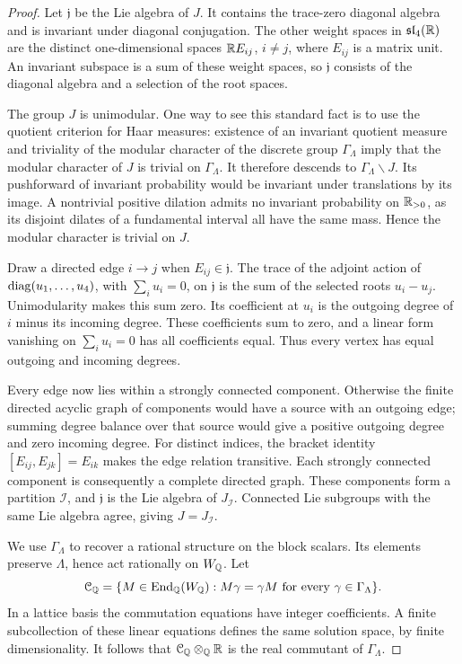 \begin{proof}
Let \(\mathfrak j\) be the Lie algebra of \(J\).
It contains the trace-zero diagonal algebra and is invariant under
diagonal conjugation.  The other weight spaces in
\(\mathfrak{sl}_4(\mathbb R)\) are the distinct one-dimensional spaces
\(\mathbb R E_{ij}\), \(i\ne j\), where \(E_{ij}\) is a matrix unit.
An invariant subspace is a sum of these weight spaces, so
\(\mathfrak j\) consists of the diagonal algebra and a selection of
the root spaces.

The group \(J\) is unimodular.
One way to see this standard fact is to use the quotient
criterion for Haar measures: existence of an invariant quotient
measure and triviality of the modular character of the discrete
group \(\Gamma_\Lambda\) imply that the modular character of \(J\)
is trivial on \(\Gamma_\Lambda\).  It therefore descends to
\(\Gamma_\Lambda\backslash J\).  Its pushforward of invariant
probability would be invariant under translations by its image.
A nontrivial positive dilation admits no invariant probability on
\(\mathbb R_{>0}\), as its disjoint dilates of a fundamental interval all
have the same mass.  Hence the modular character is trivial on \(J\).

Draw a directed edge \(i\to j\) when \(E_{ij}\in\mathfrak j\).
The trace of the adjoint action of
\(\operatorname{diag}(u_1,\ldots,u_4)\), with \(\sum_i u_i=0\), on
\(\mathfrak j\) is the sum of the selected roots \(u_i-u_j\).
Unimodularity makes this sum zero.  Its coefficient at \(u_i\) is
the outgoing degree of \(i\) minus its incoming degree.  These
coefficients sum to zero, and a linear form vanishing on
\(\sum_i u_i=0\) has all coefficients equal.  Thus every vertex
has equal outgoing and incoming degrees.

Every edge now lies within a strongly connected component.
Otherwise the finite directed acyclic graph of components would
have a source with an outgoing edge; summing degree balance over
that source would give a positive outgoing degree and zero incoming
degree.  For distinct indices, the bracket identity
\([E_{ij},E_{jk}]=E_{ik}\) makes the edge relation transitive.
Each strongly connected component is consequently a complete
directed graph.  These components form a partition \(\mathcal I\),
and \(\mathfrak j\) is the Lie algebra of \(J_{\mathcal I}\).
Connected Lie subgroups with the same Lie algebra agree, giving
\(J=J_{\mathcal I}\).

We use \(\Gamma_\Lambda\) to recover a rational structure on the
block scalars.  Its elements preserve \(\Lambda\), hence act
rationally on \(W_\mathbb Q\).  Let
\[
 \mathcal C_\mathbb Q
 =\{M\in\operatorname{End}_\mathbb Q(W_\mathbb Q):M\gamma=\gamma M
                         \text{ for every }\gamma\in\Gamma_\Lambda\}.
\]
In a lattice basis the commutation equations have integer
coefficients.  A finite subcollection of these linear equations
defines the same solution space, by finite dimensionality.
It follows that \(\mathcal C_\mathbb Q\otimes_\mathbb Q\mathbb R\) is the real
commutant of \(\Gamma_\Lambda\).


\end{proof}
